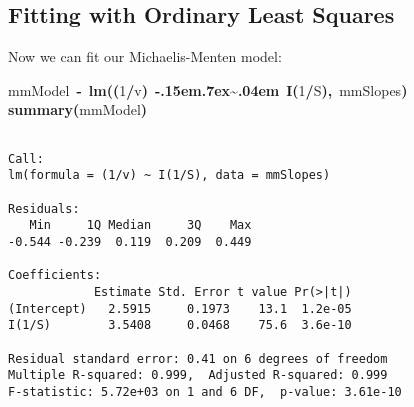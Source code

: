 \documentclass{article}\usepackage{graphicx, color}
\makeatletter
\newcommand{\hlnumber}[1]{\textcolor[rgb]{0,0,0}{#1}}%
\newcommand{\hlfunctioncall}[1]{\textcolor[rgb]{0.501960784313725,0,0.329411764705882}{\textbf{#1}}}%
\newcommand{\hlkeyword}[1]{\textcolor[rgb]{0,0,0}{\textbf{#1}}}%
\newcommand{\hlassignement}[1]{\textcolor[rgb]{0,0,0}{\textbf{#1}}}%
\newcommand{\hlsymbol}[1]{\textcolor[rgb]{0,0,0}{#1}}%
\def\urltilda{\kern -.15em\lower .7ex\hbox{\~{}}\kern .04em}%
\newcommand{\hlstd}[1]{\textcolor[rgb]{0,0,0}{#1}}%
\newenvironment{kframe}{%
 \def\FrameCommand##1{\hskip\@totalleftmargin \hskip-\fboxsep
 \colorbox{shadecolor}{##1}\hskip-\fboxsep
     \hskip-\linewidth \hskip-\@totalleftmargin \hskip\columnwidth}%
 \MakeFramed {\advance\hsize-\width
   \@totalleftmargin\z@ \linewidth\hsize
   \@setminipage}}%
 {\par\unskip\endMakeFramed}
\newenvironment{knitrout}{}{} %
\makeatother
\begin{document}
\subsection{Fitting with Ordinary Least Squares}
Now we can fit our Michaelis-Menten model:
\begin{knitrout}
\color{fgcolor}\begin{kframe}
\begin{flushleft}
\ttfamily\noindent
\hlsymbol{mmModel}{\ }\hlassignement{\usebox{\hlnormalsizeboxlessthan}-}{\ }\hlfunctioncall{lm}\hlkeyword{(}\hlkeyword{(}\hlnumber{1}\hlkeyword{/}\hlsymbol{v}\hlkeyword{)}{\ }\hlkeyword{\urltilda{}}{\ }\hlfunctioncall{I}\hlkeyword{(}\hlnumber{1}\hlkeyword{/}\hlsymbol{S}\hlkeyword{)}\hlkeyword{,}{\ }\hlsymbol{mmSlopes}\hlkeyword{)}\hspace*{\fill}\\
\hlstd{}\hlfunctioncall{summary}\hlkeyword{(}\hlsymbol{mmModel}\hlkeyword{)}\mbox{}
\normalfont
\end{flushleft}
\begin{verbatim}

Call:
lm(formula = (1/v) ~ I(1/S), data = mmSlopes)

Residuals:
   Min     1Q Median     3Q    Max 
-0.544 -0.239  0.119  0.209  0.449 

Coefficients:
            Estimate Std. Error t value Pr(>|t|)
(Intercept)   2.5915     0.1973    13.1  1.2e-05
I(1/S)        3.5408     0.0468    75.6  3.6e-10

Residual standard error: 0.41 on 6 degrees of freedom
Multiple R-squared: 0.999,	Adjusted R-squared: 0.999 
F-statistic: 5.72e+03 on 1 and 6 DF,  p-value: 3.61e-10 


\end{verbatim}
\end{kframe}
\end{knitrout}
\end{document}
